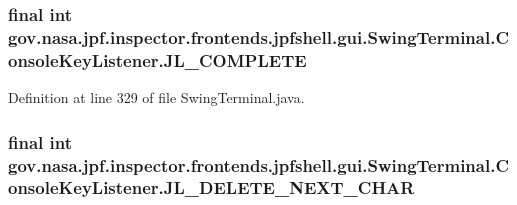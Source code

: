 \subsubsection[{\texorpdfstring{J\+L\+\_\+\+C\+O\+M\+P\+L\+E\+TE}{JL_COMPLETE}}]{\setlength{\rightskip}{0pt plus 5cm}final int gov.\+nasa.\+jpf.\+inspector.\+frontends.\+jpfshell.\+gui.\+Swing\+Terminal.\+Console\+Key\+Listener.\+J\+L\+\_\+\+C\+O\+M\+P\+L\+E\+TE\hspace{0.3cm}{\ttfamily [private]}}\hypertarget{classgov_1_1nasa_1_1jpf_1_1inspector_1_1frontends_1_1jpfshell_1_1gui_1_1_swing_terminal_1_1_console_key_listener_a9b960c4fda1d967fa3b47c185cb4b7cb}{}\label{classgov_1_1nasa_1_1jpf_1_1inspector_1_1frontends_1_1jpfshell_1_1gui_1_1_swing_terminal_1_1_console_key_listener_a9b960c4fda1d967fa3b47c185cb4b7cb}


Definition at line 329 of file Swing\+Terminal.\+java.

\subsubsection[{\texorpdfstring{J\+L\+\_\+\+D\+E\+L\+E\+T\+E\+\_\+\+N\+E\+X\+T\+\_\+\+C\+H\+AR}{JL_DELETE_NEXT_CHAR}}]{\setlength{\rightskip}{0pt plus 5cm}final int gov.\+nasa.\+jpf.\+inspector.\+frontends.\+jpfshell.\+gui.\+Swing\+Terminal.\+Console\+Key\+Listener.\+J\+L\+\_\+\+D\+E\+L\+E\+T\+E\+\_\+\+N\+E\+X\+T\+\_\+\+C\+H\+AR\hspace{0.3cm}{\ttfamily [private]}}\hypertarget{classgov_1_1nasa_1_1jpf_1_1inspector_1_1frontends_1_1jpfshell_1_1gui_1_1_swing_terminal_1_1_console_key_listener_acfbea41dbd4f4a71882a22522de6afbf}{}\label{classgov_1_1nasa_1_1jpf_1_1inspector_1_1frontends_1_1jpfshell_1_1gui_1_1_swing_terminal_1_1_console_key_listener_acfbea41dbd4f4a71882a22522de6afbf}


